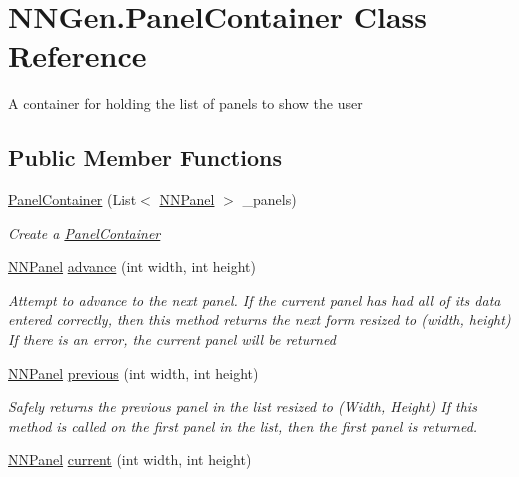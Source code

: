 \hypertarget{class_n_n_gen_1_1_panel_container}{}\section{N\+N\+Gen.\+Panel\+Container Class Reference}
\label{class_n_n_gen_1_1_panel_container}


A container for holding the list of panels to show the user  


\subsection*{Public Member Functions}
\begin{DoxyCompactItemize}
\item 
\hyperlink{class_n_n_gen_1_1_panel_container_aff90f9069cacfacb87c98c4683c00a08}{Panel\+Container} (List$<$ \hyperlink{class_n_n_gen_1_1_n_n_panel}{N\+N\+Panel} $>$ \+\_\+panels)
\begin{DoxyCompactList}\small\item\em Create a \hyperlink{class_n_n_gen_1_1_panel_container}{Panel\+Container} \end{DoxyCompactList}\item 
\hyperlink{class_n_n_gen_1_1_n_n_panel}{N\+N\+Panel} \hyperlink{class_n_n_gen_1_1_panel_container_abcf640c5145757f67e0e39529e62d9a3}{advance} (int width, int height)
\begin{DoxyCompactList}\small\item\em Attempt to advance to the next panel. If the current panel has had all of its data entered correctly, then this method returns the next form resized to (width, height) If there is an error, the current panel will be returned \end{DoxyCompactList}\item 
\hyperlink{class_n_n_gen_1_1_n_n_panel}{N\+N\+Panel} \hyperlink{class_n_n_gen_1_1_panel_container_aa1082f9ed06b22a03b46c0228d814f05}{previous} (int width, int height)
\begin{DoxyCompactList}\small\item\em Safely returns the previous panel in the list resized to (Width, Height) If this method is called on the first panel in the list, then the first panel is returned. \end{DoxyCompactList}\item 
\hyperlink{class_n_n_gen_1_1_n_n_panel}{N\+N\+Panel} \hyperlink{class_n_n_gen_1_1_panel_container_ad9762df6a510b1b7af423720da0f6130}{current} (int width, int height)

\end{DoxyCompactItemize}
